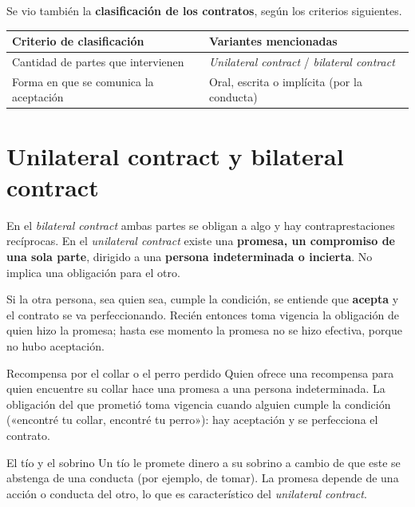 \documentclass[12pt,oneside]{book}
\begin{document}
Se vio también la \textbf{clasificación de los contratos}, según los criterios siguientes.

\begin{table}[H]
\centering
\begin{tabularx}{\textwidth}{P{5.2cm}L}
\toprule
\textbf{Criterio de clasificación} & \textbf{Variantes mencionadas} \\
\midrule
Cantidad de partes que intervienen & \textit{Unilateral contract} / \textit{bilateral contract} \\
Forma en que se comunica la aceptación & Oral, escrita o implícita (por la conducta) \\
\bottomrule
\end{tabularx}
\end{table}

\section{Unilateral contract y bilateral contract}

En el \textit{bilateral contract} ambas partes se obligan a algo y hay contraprestaciones recíprocas. En el \textit{unilateral contract} existe una \textbf{promesa, un compromiso de una sola parte}, dirigido a una \textbf{persona indeterminada o incierta}. No implica una obligación para el otro.

Si la otra persona, sea quien sea, cumple la condición, se entiende que \textbf{acepta} y el contrato se va perfeccionando. Recién entonces toma vigencia la obligación de quien hizo la promesa; hasta ese momento la promesa no se hizo efectiva, porque no hubo aceptación.

\begin{example}{Recompensa por el collar o el perro perdido}
Quien ofrece una recompensa para quien encuentre su collar hace una promesa a una persona indeterminada. La obligación del que prometió toma vigencia cuando alguien cumple la condición («encontré tu collar, encontré tu perro»): hay aceptación y se perfecciona el contrato.
\end{example}

\begin{example}{El tío y el sobrino}
Un tío le promete dinero a su sobrino a cambio de que este se abstenga de una conducta (por ejemplo, de tomar). La promesa depende de una acción o conducta del otro, lo que es característico del \textit{unilateral contract}.
\end{example}
\end{document}
